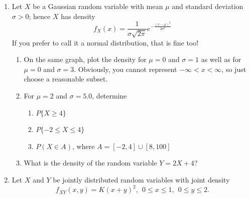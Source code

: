 \documentclass[letterpaper]{article}
\begin{document}
\begin{enumerate}
\begin{enumerate}
\begin{enumerate}
\item Sum up the e-values and compare to the trace of the matrix.

\item Summarize your observations on the e-values and the e-vectors in a few sentences. Please do not report your matrices and calculations. There is no need to turn in your MATLAB code.

\end{enumerate}

\end{enumerate}

\item Let $X$ be a Gaussian random variable with mean $\mu$ and standard deviation $\sigma>0$; hence $X$ has density
$$ f_X(x) = \frac{1}{\sigma \sqrt{2 \pi}} e^{-\frac{(x-\mu)^2}{2 \sigma^2}}$$
If you prefer to call it a normal distribution, that is fine too!

\begin{enumerate}
\setlength{\itemsep}{.1in}
\renewcommand{\labelenumi}{(\alph{enumi})}
\item On the same graph, plot the density for $\mu =0$ and $\sigma = 1$ as well as for $\mu =0$ and $\sigma = 3$. Obviously, you cannot represent $-\infty < x < \infty$, so just choose a reasonable subset.

\item For $\mu=2$ and $\sigma=5.0$, determine

\begin{enumerate}
\setlength{\itemsep}{.1in}
\renewcommand{\labelenumi}{(\alph{enumi})}

\item $P\{ X \ge 4\}$

\item $P\{  -2 \le X  \le 4 \}$

\item  $P( X \in A)$, where $ A=[-2,4] \cup [8, 100]$

\end{enumerate}

\item What is the density of the random variable $Y = 2X + 4$?

\end{enumerate}

\newpage

\item  Let $X$ and $Y$ be jointly distributed random variables with joint density
 $$ f_{XY}(x,y) = K (x+y)^2, ~~0 \le x \le 1,~~ 0 \le y \le 2.$$


\end{enumerate}
\end{document}
